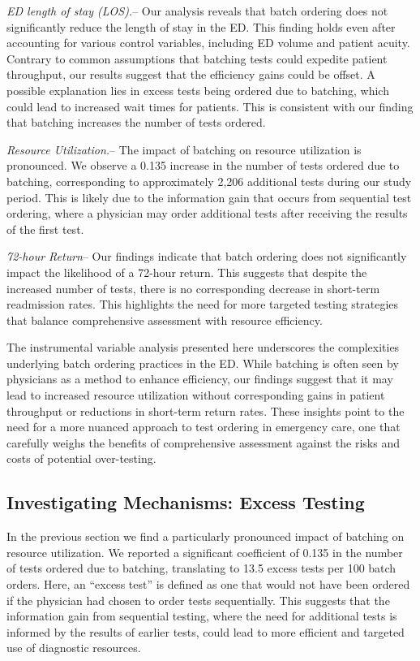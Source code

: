 \documentclass[,,nonblindrev]{informs}
\begin{document}
\emph{ED length of stay (LOS).}-- Our analysis reveals that batch
ordering does not significantly reduce the length of stay in the ED.
This finding holds even after accounting for various control variables,
including ED volume and patient acuity. Contrary to common assumptions
that batching tests could expedite patient throughput, our results
suggest that the efficiency gains could be offset. A possible
explanation lies in excess tests being ordered due to batching, which
could lead to increased wait times for patients. This is consistent with
our finding that batching increases the number of tests ordered.

\emph{Resource Utilization.}-- The impact of batching on resource
utilization is pronounced. We observe a 0.135 increase in the number of
tests ordered due to batching, corresponding to approximately 2,206
additional tests during our study period. This is likely due to the
information gain that occurs from sequential test ordering, where a
physician may order additional tests after receiving the results of the
first test.

\emph{72-hour Return}-- Our findings indicate that batch ordering does
not significantly impact the likelihood of a 72-hour return. This
suggests that despite the increased number of tests, there is no
corresponding decrease in short-term readmission rates. This highlights
the need for more targeted testing strategies that balance comprehensive
assessment with resource efficiency.

The instrumental variable analysis presented here underscores the
complexities underlying batch ordering practices in the ED. While
batching is often seen by physicians as a method to enhance efficiency,
our findings suggest that it may lead to increased resource utilization
without corresponding gains in patient throughput or reductions in
short-term return rates. These insights point to the need for a more
nuanced approach to test ordering in emergency care, one that carefully
weighs the benefits of comprehensive assessment against the risks and
costs of potential over-testing.

\hypertarget{investigating-mechanisms-excess-testing}{%
\subsection{Investigating Mechanisms: Excess
Testing}\label{investigating-mechanisms-excess-testing}}

In the previous section we find a particularly pronounced impact of
batching on resource utilization. We reported a significant coefficient
of 0.135 in the number of tests ordered due to batching, translating to
13.5 excess tests per 100 batch orders. Here, an ``excess test'' is
defined as one that would not have been ordered if the physician had
chosen to order tests sequentially. This suggests that the information
gain from sequential testing, where the need for additional tests is
informed by the results of earlier tests, could lead to more efficient
and targeted use of diagnostic resources.
\end{document}
